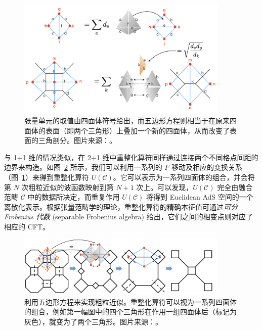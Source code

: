 \begin{figure}[htb]
  \centering
  \includegraphics[width=0.9\textwidth]{images/holographic/tetrahedra-relations.png}
  \caption[四面体符号与表面的三角剖分]{张量单元的取值由四面体符号给出，而五边形方程则相当于在原来四面体的表面（即两个三角形）上叠加一个新的四面体，从而改变了表面的三角剖分。图片来源：\parencite{chen2022exact}。}
  \label{fig:tetrahedra-relations}
\end{figure}

与 1+1 维的情况类似，在 2+1 维中重整化算符同样通过连接两个不同格点间距的边界来构造。如图~\ref{fig:rg-2+1d} 所示，我们可以利用一系列的 $F$ 移动及相应的变换关系（图~\ref{fig:tetrahedra-relations}）来得到重整化算符 $U(\mathcal{C})$\cite{vanhove2018mapping}。它可以表示为一系列四面体的组合，并会将第 $N$ 次粗粒近似的波函数映射到第 $N+1$ 次上。可以发现，$U(\mathcal{C})$ 完全由融合范畴 $\mathcal{C}$ 中的数据所决定，而重复作用 $U(\mathcal{C})$ 将得到 Euclidean AdS 空间的一个离散化表示。根据张量范畴学的理论，重整化算符的精确本征值可通过\emph{可分 Frobenius 代数} (separable Frobenius algebra) 给出，它们之间的相变点则对应了相应的 CFT。

\begin{figure}[htb]
  \centering
  \includegraphics[width=0.9\textwidth]{images/holographic/rg-2+1d.png}
  \caption[利用五边形方程来实现粗粒近似]{利用五边形方程来实现粗粒近似。重整化算符可以视为一系列四面体的组合，例如第一幅图中的四个三角形在作用一组四面体后（标记为灰色），就变为了两个三角形。图片来源：\parencite{chen2022exact}。}
  \label{fig:rg-2+1d}
\end{figure}


